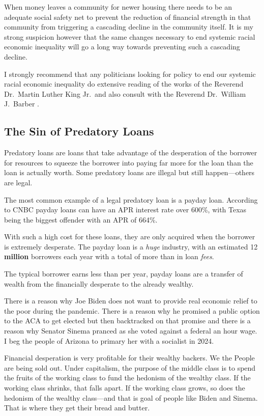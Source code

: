 When money leaves a community for newer housing there needs to be an adequate social safety net to prevent the reduction of financial strength in that community from triggering a cascading decline in the community itself. It is my strong suspicion however that the same changes necessary to end systemic racial economic inequality will go a long way towards preventing such a cascading decline.

I strongly recommend that any politicians looking for policy to end our systemic racial economic inequality do extensive reading of the works of the Reverend Dr.\ Martin Luther King Jr.\ and also consult with the Reverend Dr.\ William J.\ Barber .

\subsection{The Sin of Predatory Loans}

Predatory loans are loans that take advantage of the desperation of the borrower for resources to squeeze the borrower into paying far more for the loan than the loan is actually worth. Some predatory loans are illegal but still happen---others are legal.

The most common example of a legal predatory loan is a payday loan. According to CNBC payday loans can have an APR interest rate over 600\%, with Texas being the biggest offender with an APR of 664\%.

With such a high cost for these loans, they are only acquired when the borrower is extremely desperate. The payday loan is a \emph{huge} industry, with an estimated 12 \textbf{million} borrowers each year with a total of more than  in loan \emph{fees}.

The typical borrower earns less than  per year, payday loans are a transfer of wealth from the financially desperate to the already wealthy.

There is a reason why Joe Biden does not want to provide real economic relief to the poor during the pandemic. There is a reason why he promised a public option to the ACA to get elected but then backtracked on that promise and there is a reason why Senator Sinema pranced as she voted against a federal  an hour wage. I beg the people of Arizona to primary her with a socialist in 2024.

Financial desperation is very profitable for their wealthy backers. We the People are being sold out. Under capitalism, the purpose of the middle class is to spend the fruits of the working class to fund the hedonism of the wealthy class. If the working class shrinks, that falls apart. If the working class grows, so does the hedonism of the wealthy class---and that is goal of people like Biden and Sinema. That is where they get their bread and butter.

